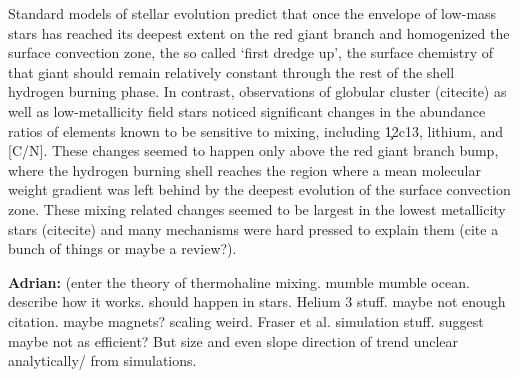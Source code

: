 Standard models of stellar evolution predict that once the envelope of low-mass stars has reached its deepest extent on the red giant branch and homogenized the surface convection zone, the so called `first dredge up', the surface chemistry of that giant should remain relatively constant through the rest of the shell hydrogen burning phase. In contrast, observations of globular cluster (citecite) as well as low-metallicity field stars \citep{Gratton2000} noticed significant changes in the abundance ratios of elements known to be sensitive to mixing, including \c12c13, lithium, and [C/N]. These changes seemed to happen only above the red giant branch bump, where the hydrogen burning shell reaches the region where a mean molecular weight gradient was left behind by the deepest evolution of the surface convection zone. These mixing related changes seemed to be largest in the lowest metallicity stars (citecite) and many mechanisms were hard pressed to explain them (cite a bunch of things or maybe a review?). 

\textbf{Adrian:} (enter the theory of thermohaline mixing. mumble mumble ocean. describe how it works. should happen in stars. Helium 3 stuff. maybe not enough citation. maybe magnets? scaling weird. Fraser et al. simulation stuff.  suggest maybe not as efficient? But size and even slope direction of trend unclear analytically/ from simulations. 

